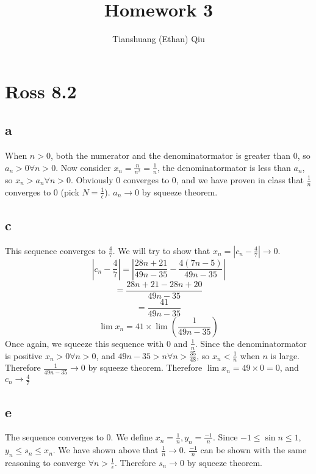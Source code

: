 \documentclass[12pt]{article}
\author{Tianshuang (Ethan) Qiu}
\begin{document}
\title{Homework 3}
\maketitle
\newpage

\section{Ross 8.2}

\subsection{a}
When $n>0$, both the numerator and the denominatormator is greater than 0, so $a_n > 0 \forall n>0$. Now consider $x_n = \frac{n}{n^2} = \frac{1}{n}$, the denominatormator is less than $a_n$, so $x_n > a_n \forall n>0$.
\newline
Obviously 0 converges to 0, and we have proven in class that $\frac{1}{n}$ converges to 0 (pick $N = \frac{1}{\epsilon}$). $a_n \to 0$ by squeeze theorem.


\subsection{c}
This sequence converges to $\frac{4}{7}$. We will try to show that $x_n = |c_n-\frac{4}{7}| \to 0$.
\newline
$$|c_n-\frac{4}{7}| = |\frac{28n+21}{49n-35} - \frac{4(7n-5)}{49n-35}|$$
$$= \frac{28n+21-28n+20}{49n-35}$$
$$= \frac{41}{49n-35}$$
$$\lim x_n = 41 \times \lim (\frac{1}{49n-35})$$
Once again, we squeeze this sequence with 0 and $\frac{1}{n}$. Since the denominatormator is positive $x_n > 0 \forall n>0$, and $49n-35 > n \forall n>\frac{35}{48}$, so $x_n < \frac{1}{n}$ when $n$ is large. Therefore $\frac{1}{49n-35} \to 0$ by squeeze theorem.
\newline
Therefore $\lim x_n = 49 \times 0 = 0$, and $c_n \to \frac{4}{7}$


\subsection{e}
The sequence converges to 0. We define $x_n = \frac{1}{n}, y_n = \frac{-1}{n}$. Since $-1 \leq \sin n \leq 1$, $y_n \leq s_n \leq x_n$.
\newline
We have shown above that $\frac{1}{n} \to 0$. $\frac{-1}{n}$ can be shown with the same reasoning to converge $\forall n>\frac{1}{\epsilon}$. Therefore $s_n \to 0$ by squeeze theorem.
\newpage
\end{document}
